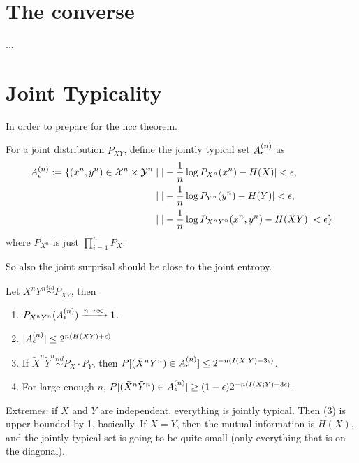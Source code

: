 \section{The converse}
...

\section{Joint Typicality}
In order to prepare for the ncc theorem.

\begin{definition}
For a joint distribution $P_{XY}$, define the jointly typical set $A_{\epsilon}^{(n)}$ as
\begin{align*}
A_{\epsilon}^{(n)} := \{(x^n,y^n) \in \mathcal{X}^n \times \mathcal{Y}^n &\mid | - \frac{1}{n} \log P_{X^n}(x^n) - H(X)| < \epsilon,\\
&\mid | - \frac{1}{n} \log P_{Y^n}(y^n) - H(Y)| < \epsilon,\\
&\mid | - \frac{1}{n} \log P_{X^nY^n}(x^n,y^n) - H(XY)| < \epsilon\}
\end{align*}
where $P_{X^n}$ is just $\prod_{i=1}^n P_X$.
\end{definition}
So also the joint surprisal should be close to the joint entropy.

\begin{theorem}
Let $X^nY^n \stackrel{iid}{\sim} P_{XY}$, then
\begin{enumerate}
\item $P_{X^nY^n}(A_{\epsilon}^{(n)}) \xrightarrow{n \to \infty} 1$.
\item $|A_{\epsilon}^{(n)}| \leq 2^{n(H(XY) + \epsilon)}$
\item If $\tilde{X}^n\tilde{Y}^n \stackrel{iid}{\sim} P_X \cdot P_Y$, then $P[(\tilde{X}^n\tilde{Y}^n) \in A_{\epsilon}^{(n)}] \leq 2^{-n(I(X;Y) - 3\epsilon)}$.
\item For large enough $n$, $P[(\tilde{X}^n\tilde{Y}^n) \in A_{\epsilon}^{(n)}] \geq (1-\epsilon)2^{-n(I(X;Y) + 3 \epsilon)}$.
\end{enumerate}
\end{theorem}
Extremes: if $X$ and $Y$ are independent, everything is jointly typical. Then (3) is upper bounded by 1, basically.
If $X = Y$, then the mutual information is $H(X)$, and the jointly typical set is going to be quite small (only everything that is on the diagonal).

